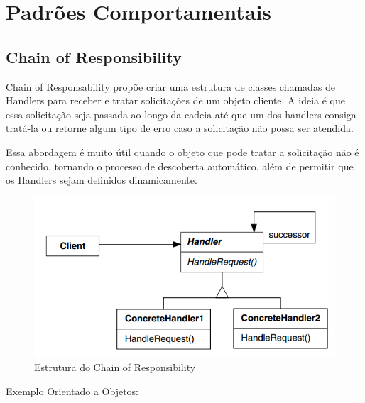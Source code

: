\chapter{Padrões Comportamentais}

\section{Chain of Responsibility}

Chain of Responsability propõe criar uma estrutura de classes 
chamadas de Handlers para receber e tratar solicitações de um 
objeto cliente. A ideia é que essa solicitação seja passada ao 
longo da cadeia até que um dos handlers consiga tratá-la ou 
retorne algum tipo de erro caso a solicitação não possa ser 
atendida.

Essa abordagem é muito útil quando o objeto que pode tratar 
a solicitação não é conhecido, tornando o processo de 
descoberta automático, além de permitir que os Handlers sejam 
definidos dinamicamente.

\begin{figure}[htb]
	\caption{\label{chain_struct}Estrutura do Chain of Responsibility}
	\begin{center}
	    \includegraphics[scale=0.5]{5_padroes-contexto-funcional/5.3_comportamentais/5.3.01_chain-of-responsibility/diagram.png}
	\end{center}
\end{figure}

Exemplo Orientado a Objetos:

\begin{lstlisting}[caption={Chain of Responsibility Orientação a Objetos},label=oochresponsibility]


    
\end{lstlisting}

